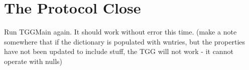 \newpage
\section{The Protocol Close}
\genHeader


Run TGGMain again. It should work without error this time. (make a note somewhere that if the dictionary is populated with wntries, but the properties have not
been updated to include stuff, the TGG will not work - it cannot operate with nulls)
